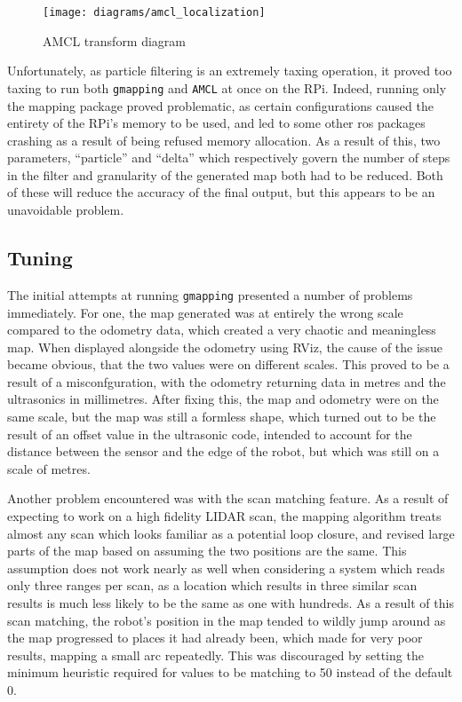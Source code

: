 \begin{figure}[H]
	\centering
	\texttt{[image: diagrams/amcl\_localization]}
	\caption{AMCL transform diagram~\cite{macenski_amcl}}\label{fig:amcl}
\end{figure}

Unfortunately, as particle filtering is an extremely taxing operation, it proved too taxing to run both
\verb|gmapping| and \verb|AMCL| at once on the RPi. Indeed, running only the mapping package proved problematic,
as certain configurations caused the entirety of the RPi's memory to be used, and led to some other ros packages
crashing as a result of being refused memory allocation. As a result of this, two parameters, ``particle'' and
``delta'' which respectively govern the number of steps in the filter and granularity of the generated map both
had to be reduced. Both of these will reduce the accuracy of the final output, but this appears to be an unavoidable problem.

\subsection{Tuning}\label{soft/SLAM/tuning}

The initial attempts at running \verb|gmapping| presented a number of problems immediately. For one, the map
generated was at entirely the wrong scale compared to the odometry data, which created a very chaotic and meaningless
map. When displayed alongside the odometry using RViz, the cause of the issue became obvious, that the two values were
on different scales. This proved to be a result of a misconfguration, with the odometry returning data in metres and
the ultrasonics in millimetres. After fixing this, the map and odometry were on the same scale, but the map was still
a formless shape, which turned out to be the result of an offset value in the ultrasonic code, intended to account
for the distance between the sensor and the edge of the robot, but which was still on a scale of metres. 

Another problem encountered was with the scan matching feature. As a result of expecting to work on a high fidelity
LIDAR scan, the mapping algorithm treats almost any scan which looks familiar as a potential loop closure, and revised
large parts of the map based on assuming the two positions are the same. This assumption does not work nearly as well
when considering a system which reads only three ranges per scan, as a location which results in three similar
scan results is much less likely to be the same as one with hundreds. As a result of this scan matching, the robot's
position in the map tended to wildly jump around as the map progressed to places it had already been, which made for
very poor results, mapping a small arc repeatedly. This was discouraged by setting the minimum heuristic required for
values to be matching to 50 instead of the default 0.


